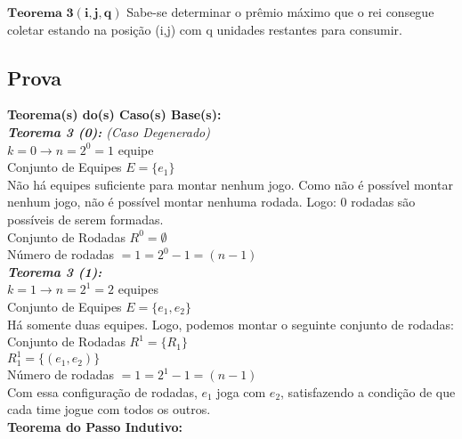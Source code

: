 \documentclass[twoside]{article}
\begin{document}
\begin{multicols}{2}
$\mathbf{Teorema}$ $\mathbf{3}$$\mathbf{(i,j,q)}$ Sabe-se determinar o prêmio máximo que o rei consegue coletar estando na posição (i,j) com q unidades restantes para consumir.\\

\subsection{ Prova }
\indent 

\textbf{Teorema(s) do(s) Caso(s) Base(s):}\\

\textit{\textbf{Teorema 3 (0):} (Caso Degenerado)}\\
$ k=0 \rightarrow n=2^0=1$ equipe\\
Conjunto de Equipes $E = \{e_1\}$\\
Não há equipes suficiente para montar nenhum jogo. Como não é possível montar nenhum jogo, não é possível montar nenhuma rodada. Logo: 0 rodadas são possíveis de serem formadas.\\
Conjunto de Rodadas $R^0 = \emptyset$\\
Número de rodadas $= 1 = 2^0-1 = (n-1)$\\

\textit{\textbf{Teorema 3 (1):}}\\
$ k=1 \rightarrow n=2^1=2$ equipes\\
Conjunto de Equipes $E = \{e_1,e_2\}$\\
Há somente duas equipes. Logo, podemos montar o seguinte conjunto de rodadas:\\
Conjunto de Rodadas $R^1 = \{R_1\}$\\
 $R^1_1 =\{(e_1,e_2)\}$\\
Número de rodadas $= 1 = 2^1-1 = (n-1)$\\
Com essa configuração de rodadas, $e_1$ joga com $e_2$, satisfazendo a condição de que cada time jogue com todos os outros.\\

\textbf{Teorema do Passo Indutivo:}\\


\end{multicols}
\end{document}
